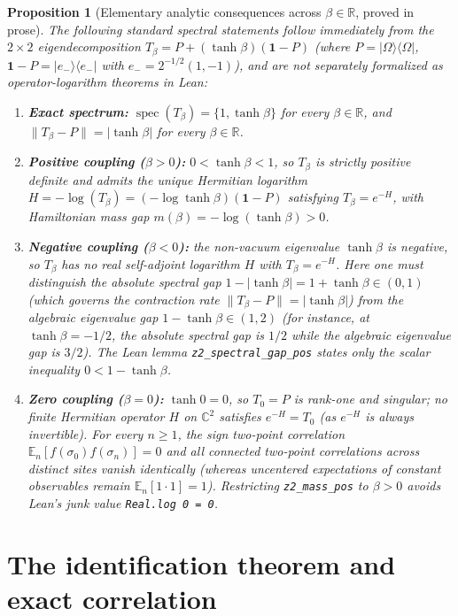 \documentclass[11pt]{article}
\newtheorem{proposition}[theorem]{Proposition}
\theoremstyle{remark}
\theoremstyle{definition}
\newcommand{\lean}[1]{\texttt{#1}}
\newcommand{\R}{\mathbb{R}}
\newcommand{\C}{\mathbb{C}}
\newcommand{\Om}{\Omega}
\newcommand{\Ex}{\mathbb{E}}
\newcommand{\ket}[1]{|#1\rangle}
\newcommand{\bra}[1]{\langle #1|}
\begin{document}
\begin{proposition}[Elementary analytic consequences across $\beta \in \R$, proved in prose]
\label{prop:analytic-spectral}
The following standard spectral statements follow immediately from the $2\times 2$
eigendecomposition $T_\beta = P + (\tanh\beta)(\mathbf{1}-P)$ (where $P = \ket{\Om}\bra{\Om}$,
$\mathbf{1}-P = \ket{e_-}\bra{e_-}$ with $e_- = 2^{-1/2}(1,-1)$), and are \emph{not}
separately formalized as operator-logarithm theorems in Lean:
\begin{enumerate}
  \item \textbf{Exact spectrum:} $\operatorname{spec}(T_\beta) = \{1, \tanh\beta\}$ for every
  $\beta \in \R$, and $\|T_\beta - P\| = |\tanh\beta|$ for every $\beta \in \R$.
  \item \textbf{Positive coupling ($\beta > 0$):} $0 < \tanh\beta < 1$, so $T_\beta$ is
  strictly positive definite and admits the unique Hermitian logarithm
  $H = -\log(T_\beta) = (-\log\tanh\beta)(\mathbf{1}-P)$ satisfying $T_\beta = e^{-H}$,
  with Hamiltonian mass gap $m(\beta) = -\log(\tanh\beta) > 0$.
  \item \textbf{Negative coupling ($\beta < 0$):} the non-vacuum eigenvalue $\tanh\beta$ is
  negative, so $T_\beta$ has no real self-adjoint logarithm $H$ with $T_\beta = e^{-H}$.
  Here one must distinguish the \emph{absolute spectral gap}
  $1 - |\tanh\beta| = 1 + \tanh\beta \in (0,1)$ (which governs the contraction rate
  $\|T_\beta - P\| = |\tanh\beta|$) from the \emph{algebraic eigenvalue gap}
  $1 - \tanh\beta \in (1,2)$ (for instance, at $\tanh\beta = -1/2$, the absolute spectral
  gap is $1/2$ while the algebraic eigenvalue gap is $3/2$). The Lean lemma
  \lean{z2\_spectral\_gap\_pos} states only the scalar inequality $0 < 1 - \tanh\beta$.
  \item \textbf{Zero coupling ($\beta = 0$):} $\tanh 0 = 0$, so $T_0 = P$ is rank-one and
  singular; no finite Hermitian operator $H$ on $\C^2$ satisfies $e^{-H} = T_0$ (as $e^{-H}$
  is always invertible). For every $n \ge 1$, the sign two-point correlation
  $\Ex_n[f(\sigma_0)f(\sigma_n)] = 0$ and all connected two-point correlations across
  distinct sites vanish identically (whereas uncentered expectations of constant observables
  remain $\Ex_n[1 \cdot 1] = 1$). Restricting \lean{z2\_mass\_pos} to $\beta > 0$ avoids
  Lean's junk value \lean{Real.log 0 = 0}.
\end{enumerate}
\end{proposition}

\section{The identification theorem and exact correlation}\label{sec:ident}
\end{document}
